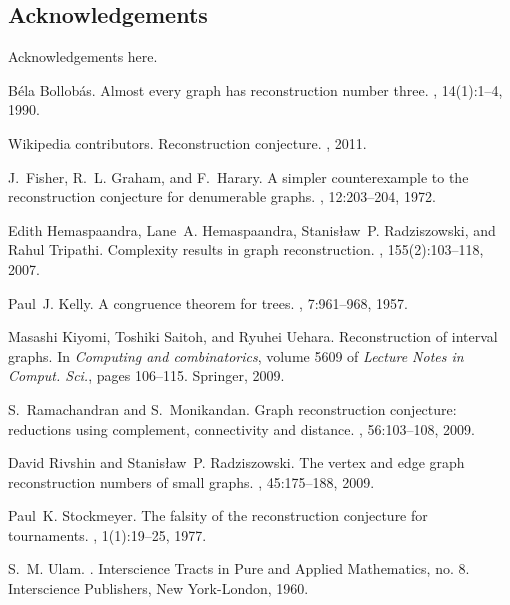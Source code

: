 \documentclass[12pt]{article}
\theoremstyle{plain}
\theoremstyle{definition}
\theoremstyle{remark}
\begin{document}
\subsection*{Acknowledgements}
Acknowledgements here.

%  
%  

\begin{thebibliography}{10}

 B{\'e}la Bollob{\'a}s.  \newblock Almost every
  graph has reconstruction number three.  , 14(1):1--4, 1990.

 Wikipedia contributors.  \newblock
  Reconstruction conjecture.  , 2011.

 J.~Fisher, R.~L. Graham, and F.~Harary.  \newblock A
  simpler counterexample to the reconstruction conjecture for
  denumerable graphs.  ,
  12:203--204, 1972.

 Edith Hemaspaandra, Lane~A. Hemaspaandra,
  Stanis{\l}aw~P. Radziszowski, and Rahul Tripathi.  \newblock
  Complexity results in graph reconstruction.  , 155(2):103--118, 2007.

 Paul~J. Kelly.  \newblock A congruence theorem for
  trees.  , 7:961--968, 1957.

 Masashi Kiyomi, Toshiki Saitoh, and Ryuhei Uehara.
  \newblock Reconstruction of interval graphs.  \newblock In {\em
    Computing and combinatorics}, volume 5609 of {\em Lecture Notes in
    Comput. Sci.}, pages 106--115. Springer, 2009.

 S.~Ramachandran and S.~Monikandan.  \newblock Graph
  reconstruction conjecture: reductions using complement, connectivity
  and distance.  ,
  56:103--108, 2009.

 David Rivshin and Stanis{\l}aw~P. Radziszowski.
  \newblock The vertex and edge graph reconstruction numbers of small
  graphs.  , 45:175--188, 2009.

 Paul~K. Stockmeyer.  \newblock The falsity of the
  reconstruction conjecture for tournaments.  , 1(1):19--25, 1977.

 S.~M. Ulam.  .  \newblock Interscience Tracts in Pure and
  Applied Mathematics, no. 8.  Interscience Publishers, New
  York-London, 1960.

\end{thebibliography}
\end{document}
